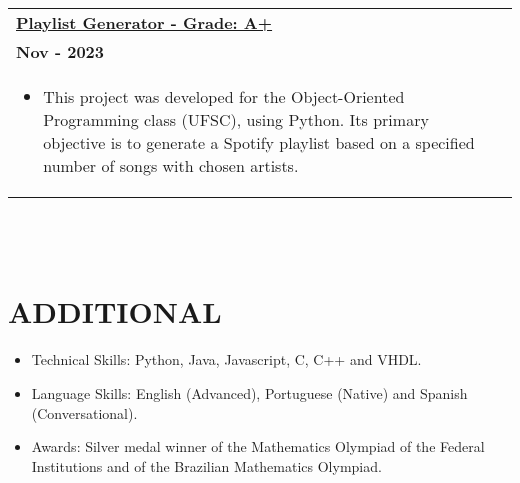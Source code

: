 \documentclass[a4paper,8pt]{article}
\begin{document}
\begin{tabularx}{\linewidth}{ @{}l r@{} }
\textbf{\href{https://github.com/leonardosm14/Playlist-Generator}{Playlist Generator - Grade: A+}} \\[4pt]
\textbf{Nov - 2023} \\[4pt]
\begin{minipage}[t]{\linewidth}
    \begin{itemize}[nosep,after=\strut, leftmargin=1em, itemsep=2pt]
        \item This project was developed for the Object-Oriented Programming class (UFSC), using Python. Its primary objective is to generate a Spotify playlist based on a specified number of songs with chosen artists.
    \end{itemize}
\end{minipage}
\end{tabularx}
\\

\\
\section{\textbf{ADDITIONAL}}
\begin{minipage}[t]{\linewidth}
    \begin{itemize}[nosep,after=\strut, leftmargin=1em, itemsep=2pt]
        \item Technical Skills: Python, Java, Javascript, C, C++ and VHDL.
        \item Language Skills: English (Advanced), Portuguese 
        (Native) and Spanish (Conversational).
        \item Awards: Silver medal winner of the Mathematics Olympiad of the Federal Institutions and of the Brazilian Mathematics Olympiad.
    \end{itemize}
\end{minipage}
\end{document}
